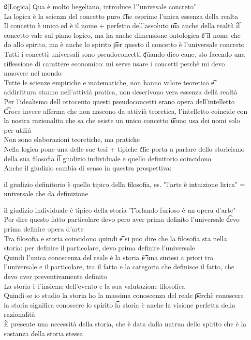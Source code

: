 \documentclass[12pt]{article}
\begin{document}
\ss[Logica]
Qua è molto hegeliano, introduce l'"univesale concreto" \\
La logica è la scienza del concetto puro \t che esprime l'unica essenza della realta \\
Il concetto è unico ed è il nome + perfetto dell'assoluto \t ma anche della realtà \t il concetto vale sul piano logico, ma ha anche dimensione ontologica \t è il nome che do allo spirito, ma è anche lo spirito \t per questo il concetto è l'universale concreto \\
Tutti i concetti universali sono pseudoconcetti \t quando dico cane, sto facendo una riflessione di carattere economico: mi serve usare i concetti perchè mi devo muovere nel mondo \\
Tutte le scienze empiriche e matematiche, non hanno valore teoretico \t e addirittura stanno nell'attivià pratica, non descrivono vera essenza dellà realtà \\
Per l'idealismo dell ottocento questi pseudoconcetti erano opera dell'intelletto \t Croce invece afferma che non nascono da attivià teoretica, l'intelletto coincide con la nostra razionalita che sa che esiste un unico concetto \t uomo usa dei nomi solo per utilià \\
Non sono elaborazioni teoretiche, ma pratiche \\
Nella logica pone una delle sue tesi + tipiche \t che porta a parlare dello storicismo della sua filosofia \t il giudizio individuale e quello definitorio coincidono \\
Anche il giudizio cambia di senso in questra prospettiva:
\bi
  \item il giudizio definitorio è quello tipico della filosofia, es. "l'arte è intuizione lirica" = universale che da definizione 
  \item il giudizio individuale è tipico della storia \t "l'orlando furioso è un opera d'arte"
\ei
Per dire questo fatto particolare devo pero aver prima definito l'universale \t devo prima definire opera d'arte \\
Tra filosofia e storia coincidono quindi \t e si puo dire che la filosofia sta nella storia: per definire il particolare, devo prima definire l'universale \\
Quindi l'unica conoscenza del reale è la storia \t è una sintesi a priori tra l'universale e il particolare, tra il fatto e la categoria che definisce il fatto, che devo aver preventivamente definito \\
La storia è l'insieme dell'evento e la sua valutazione filosofica \\
Quindi se io studio la storia ho la massima conoscenza del reale \t perchè conoscere la storia significa conoscere lo spirito \t la storia è anche la visione perfetta della razionalità \\
È presente una necessità della storia, che è data dalla natrua dello spirito che è la sostanza della storia stessa
\end{document}
